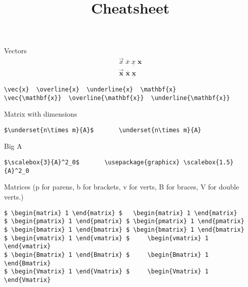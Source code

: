 \documentclass[12pt]{article}
\title{Cheatsheet}
\author{}
\date{}
\begin{document}
\maketitle

Vectors
\begin{gather*}
	\vec{x} \;  \overline{x}  \; \underline{x} \;  \mathbf{x} \\
	\vec{\mathbf{x}}  \; \overline{\mathbf{x}} \;  \underline{\mathbf{x}} 
\end{gather*}

\begin{lstlisting}
\vec{x}  \overline{x}  \underline{x}  \mathbf{x}
\vec{\mathbf{x}}  \overline{\mathbf{x}}  \underline{\mathbf{x}} 
\end{lstlisting}

Matrix with dimensions
\begin{lstlisting}[mathescape]
$\underset{n\times m}{A}$		\underset{n\times m}{A} 
\end{lstlisting}

Big A
\begin{lstlisting}[mathescape]
$\scalebox{3}{A}^2_0$		\usepackage{graphicx} \scalebox{1.5}{A}^2_0
\end{lstlisting}

Matrices (p for parens, b for brackets, v for verts, B for braces, V for double verts.)
\begin{lstlisting}[mathescape]
$ \begin{matrix} 1 \end{matrix} $	\begin{matrix} 1 \end{matrix}
$ \begin{pmatrix} 1 \end{pmatrix} $	\begin{pmatrix} 1 \end{pmatrix}
$ \begin{bmatrix} 1 \end{bmatrix} $	\begin{bmatrix} 1 \end{bmatrix}
$ \begin{vmatrix} 1 \end{vmatrix} $ 	\begin{vmatrix} 1 \end{vmatrix}
$ \begin{Bmatrix} 1 \end{Bmatrix} $ 	\begin{Bmatrix} 1 \end{Bmatrix}
$ \begin{Vmatrix} 1 \end{Vmatrix} $ 	\begin{Vmatrix} 1 \end{Vmatrix}
\end{lstlisting}
\end{document}

